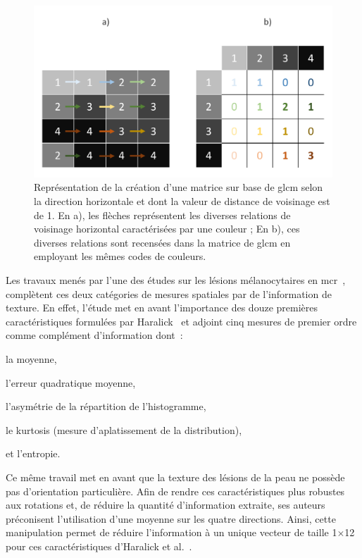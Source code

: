 \begin{figure}[H]
    \centering
    \includegraphics[width=\linewidth]{contents/chapter_5/resources/scheme_principle_GLCM.pdf}
    \caption{Représentation de la création d'une matrice sur base de \gls{glcm} selon la direction horizontale et dont la valeur de distance de voisinage est de 1. En a), les flèches représentent les diverses relations de voisinage horizontal caractérisées par une couleur ; En b), ces diverses relations sont recensées dans la matrice de \gls{glcm} en employant les mêmes codes de couleurs.}
    \label{fig:scheme_principle_GLCM}
\end{figure}\par

Les travaux menés par l'une des études sur les lésions mélanocytaires en \gls{mcr}~\cite{Wiltgen2008}, complètent ces deux catégories de mesures spatiales par de l'information de texture. En effet, l'étude met en avant l'importance des douze premières caractéristiques formulées par Haralick~\cite{Haralick1973} et adjoint cinq mesures de premier ordre comme complément d'information dont~:
\begin{inlinerate}
    \item la moyenne,
    \item l'erreur quadratique moyenne,
    \item l'asymétrie de la répartition de l'histogramme,
    \item le kurtosis (mesure d'aplatissement de la distribution),
    \item et l'entropie.
\end{inlinerate}
Ce même travail met en avant que la texture des lésions de la peau ne possède pas d'orientation particulière. Afin de rendre ces caractéristiques plus robustes aux rotations et, de réduire la quantité d'information extraite, ses auteurs préconisent l'utilisation d'une moyenne sur les quatre directions. Ainsi, cette manipulation permet de réduire l'information à un unique vecteur de taille 1$\times$12 pour ces caractéristiques d'Haralick et al.~\cite{Wiltgen2008}.\par


